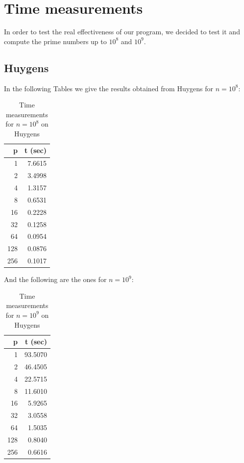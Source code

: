 \documentclass[a4paper,11pt]{article}
\begin{document}
\section{Time measurements}

In order to test the real effectiveness of our program, we decided to test it and compute the prime numbers up to $10^8$ and $10^9$.

\subsection{Huygens}

In the following Tables we give the results obtained from Huygens for $n=10^8$:

\begin{table}[H]
\begin{center}
\begin{tabular}{|r r|}
\hline
p & t (sec) \\
\hline
1 &7.6615\\
2 & 3.4998 \\
4 &1.3157\\
8 &0.6531 \\
16 &0.2228\\
32 &0.1258\\
64 &0.0954\\
128 &0.0876\\
256& 0.1017\\
\hline
\end{tabular}
\caption{Time measurements for $n=10^8$ on Huygens} \label{tab:bench}
\end{center}
\end{table}


And the following are the ones for $n=10^9$:


\begin{table}[H]
\begin{center}
\begin{tabular}{|r r|}
\hline
p & t (sec) \\
\hline
1 &93.5070 \\
2 &46.4505\\
4 &22.5715\\
8 &11.6010\\
16 &5.9265\\
32 &3.0558\\
64 &1.5035\\
128 &0.8040\\
256 &0.6616\\
\hline

\end{tabular}
\caption{Time measurements for $n=10^9$ on Huygens} \label{tab:huy}
\end{center}
\end{table}
\end{document}
